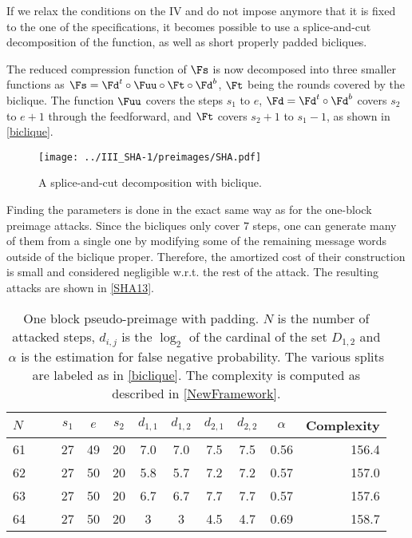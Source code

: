   If we relax the conditions on the IV and do not impose anymore that it is fixed
  to the one of the specifications, it becomes possible to use a splice-and-cut
  decomposition of the function, as well as short properly padded bicliques.

  The reduced compression function of \shaone $\Fs$ is now decomposed into three smaller
  functions as $\Fs = \Fd^t \circ \Fuu \circ \Ft \circ \Fd^b$, $\Ft$ being the rounds covered by the
  biclique. The function $\Fuu$ covers the steps $s_1$ to $e$, $\Fd = \Fd^t \circ \Fd^b$ covers
  $s_2$ to $e + 1$ through the feedforward, and $\Ft$ covers $s_2 + 1$ to $s_1 - 1$, as shown in
  \autoref{biclique}.

    \begin{figure}
	\center
      \texttt{[image: ../III\_SHA-1/preimages/SHA.pdf]}
      \caption{A splice-and-cut decomposition with biclique.\label{biclique}}
    \end{figure}

    Finding the parameters is done in the exact same way as for the one-block preimage attacks.
    Since the bicliques only cover $7$ steps, one can generate many of them
    from a single one by modifying some of the remaining message words outside of the biclique proper.
    Therefore, the amortized cost of their construction is small and considered negligible w.r.t. the
    rest of the attack. The resulting attacks are shown in \autoref{SHA13}.

  \begin{table}[ht]
    \caption[One block pseudo-preimage with padding.]{One block pseudo-preimage with padding. $N$ is the 
              number of attacked steps, $d_{i,j}$ is the $\log_2$ of the cardinal
              of the set $D_{1,2}$ and $\alpha$ is the estimation for false negative probability.
              The various splits are labeled as in \autoref{biclique}.
            The complexity is computed as described in \autoref{NewFramework}.\label{SHA13}}
    \begin{center}
      \begin{tabular}{l c c c c c  c c c r @{}} \toprule
        $N\qquad$ & $s_1$ & $e$ & $s_2$ & $d_{1,1}$ &  $d_{1,2}$ & $d_{2,1}$ & $d_{2,2}$ & $\alpha $ & Complexity \\\midrule
        61    & 27 & 49 & 20   & 7.0  & 7.0 & 7.5 & 7.5  & 0.56  & 156.4\\ 
        62    & 27 & 50 & 20   & 5.8  & 5.7 & 7.2 & 7.2  & 0.57  & 157.0\\ 
        63    & 27 & 50 & 20   & 6.7  & 6.7 & 7.7 & 7.7  & 0.57  & 157.6\\ 
        64    & 27 & 50 & 20   & 3 & 3 & 4.5 & 4.7  & 0.69  & 158.7\\ 
        \bottomrule
        \hline
      \end{tabular}
    \end{center}
  \end{table}

